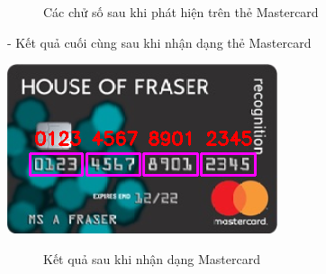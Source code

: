 \begin{figure}[htp!]
    \caption{Các chử số sau khi phát hiện trên thẻ Mastercard}
\end{figure}

- Kết quả cuối cùng sau khi nhận dạng thẻ Mastercard
\begin{center}
    \includegraphics[]{images/mastercard/Ket_qua_mastercard.png}
\end{center}

\begin{figure}[htp!]
    \caption{Kết quả sau khi nhận dạng Mastercard}
\end{figure}